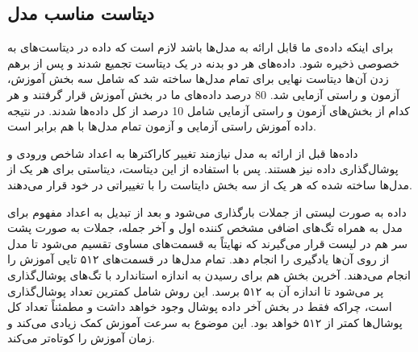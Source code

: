 \subsection{دیتاست مناسب مدل}
\hspace{30pt}
برای اینکه داده‌ی ما قابل ارائه به مدل‌ها باشد لازم است که داده در دیتاست‌های به خصوصی ذخیره شود. داده‌های هر دو بدنه در یک دیتاست تجمیع شدند و پس از برهم زدن آن‌ها دیتاست نهایی برای تمام مدل‌ها ساخته شد که شامل سه بخش آموزش، آزمون و راستی آزمایی شد. 80 درصد داده‌های ما در بخش آموزش قرار گرفتند و هر کدام از  بخش‌های آزمون و راستی آزمایی شامل 10 درصد از کل داده‌ها شدند. در نتیجه داده آموزش راستی آزمایی و آزمون تمام مدل‌ها با هم برابر است.

داده‌ها قبل از ارائه به مدل نیازمند تغییر کاراکترها به اعداد شاخص ورودی و پوشال‌گذاری داده نیز هستند. پس با استفاده از این دیتاست، دیتاستی برای هر یک از مدل‌ها ساخته شده که هر یک از سه بخش دایتاست را با تغییراتی در خود قرار می‌دهند.

داده به صورت لیستی از جملات بارگذاری می‌شود و بعد از تبدیل به اعداد مفهوم برای مدل به همراه تگ‌های اضافی مشخص کننده اول و آخر جمله، جملات به صورت پشت سر هم در لیست قرار می‌گیرند که نهايتاً به قسمت‌های مساوی تقسیم می‌شود تا مدل از روی آن‌ها یادگیری را انجام دهد. تمام مدل‌ها در قسمت‌های ۵۱۲ تایی آموزش را انجام می‌دهند. آخرین بخش هم برای رسیدن به اندازه استاندارد با تگ‌های پوشال‌گذاری پر می‌شود تا اندازه آن به ۵۱۲ برسد. این روش شامل کمترین تعداد پوشال‌گذاری است، چراکه فقط در بخش آخر داده پوشال وجود خواهد داشت و مطمئناً تعداد کل پوشال‌ها کمتر از ۵۱۲ خواهد بود. این موضوع به سرعت آموزش کمک زیادی می‌کند و زمان آموزش را کوتاه‌تر می‌کند.


